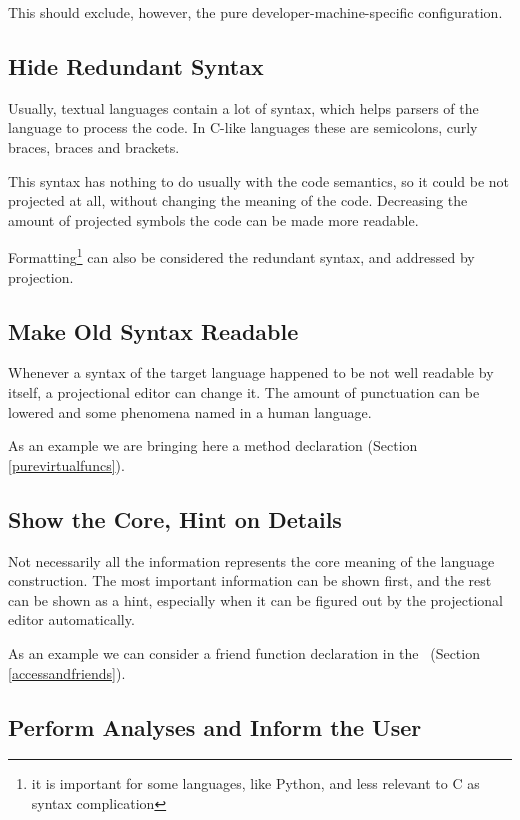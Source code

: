  This should exclude, however, the pure developer-machine-specific configuration.

\subsection{Hide Redundant Syntax}

 Usually, textual languages contain a lot of syntax, which helps parsers of the language to process the code. 
 In C-like languages these are semicolons, curly braces, braces and brackets.
 
 This syntax has nothing to do usually with the code semantics, so it could be not projected at all, without changing
 the meaning of the code. Decreasing the amount of projected symbols the code can be made more readable.
 
 Formatting\footnote{it is important for some languages, like Python, and less relevant to C as syntax complication} can also be considered the redundant syntax, and addressed by projection.

\subsection{Make Old Syntax Readable}

  Whenever a syntax of the target language happened to be not well readable by itself, a projectional editor can 
  change it. The amount of punctuation can be lowered and some phenomena named in a human language.
  
  As an example we are bringing here a  method declaration (Section \ref{purevirtualfuncs}).

\subsection{Show the Core, Hint on Details}

  Not necessarily all the information represents the core meaning of the language construction. The 
  most important information can be shown first, and the rest can be shown as a hint, especially when
  it can be figured out by the projectional editor automatically.
  
  As an example we can consider a friend function declaration in the \pcpp\ (Section \ref{accessandfriends}).

\subsection{Perform Analyses and Inform the User}
\label{analysisprinciple}

